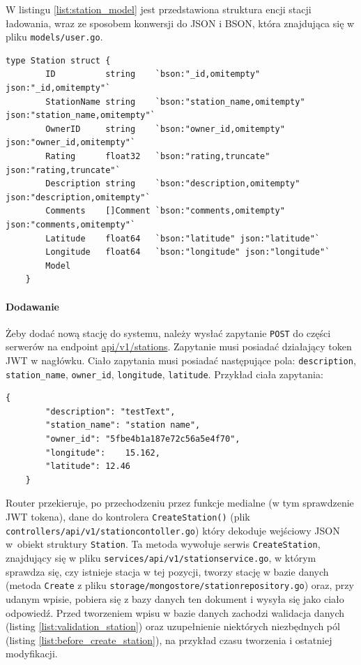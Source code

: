 W listingu \ref{list:station_model} jest przedstawiona struktura encji stacji ładowania, wraz ze sposobem konwersji do JSON i BSON, która znajdująca się w pliku \texttt{models/user.go}.
\begin{lstlisting}[label=list:station_model,caption=Model danych stacji ładowania,basicstyle=\tiny\ttfamily]
    type Station struct {
        ID          string    `bson:"_id,omitempty" json:"_id,omitempty"`
        StationName string    `bson:"station_name,omitempty" json:"station_name,omitempty"`
        OwnerID     string    `bson:"owner_id,omitempty" json:"owner_id,omitempty"`
        Rating      float32   `bson:"rating,truncate" json:"rating,truncate"`
        Description string    `bson:"description,omitempty" json:"description,omitempty"`
        Comments    []Comment `bson:"comments,omitempty" json:"comments,omitempty"`
        Latitude    float64   `bson:"latitude" json:"latitude"`
        Longitude   float64   `bson:"longitude" json:"longitude"`
        Model
    }
\end{lstlisting}

\paragraph{Dodawanie\newline}
Żeby dodać nową stację do systemu, należy wysłać zapytanie \texttt{POST} do części serwerów na endpoint \url{api/v1/stations}. Zapytanie musi posiadać działający token JWT w nagłówku. Ciało zapytania musi posiadać następujące pola: \texttt{description}, \texttt{station\_name}, \texttt{owner\_id}, \texttt{longitude}, \texttt{latitude}.
Przykład ciała zapytania:
\begin{lstlisting}[basicstyle=\tiny\ttfamily]
    {
		"description": "testText",
		"station_name": "station name",
		"owner_id": "5fbe4b1a187e72c56a5e4f70",
		"longitude":    15.162,
		"latitude": 12.46
    }
\end{lstlisting}

Router przekieruje, po przechodzeniu przez funkcje medialne (w tym sprawdzenie JWT tokena), dane do kontrolera \texttt{CreateStation()} (plik \texttt{controllers/api/v1/stationcontoller.go}) który dekoduje wejściowy JSON w~obiekt struktury \texttt{Station}.
Ta metoda wywołuje serwis \texttt{CreateStation}, znajdujący się w pliku \texttt{services/api/v1/stationservice.go}, w którym sprawdza się, czy istnieje stacja w tej pozycji, tworzy stację w bazie danych (metoda \texttt{Create} z pliku \texttt{storage/mongostore/stationrepository.go}) oraz, przy udanym wpisie, pobiera się z bazy danych ten dokument i wysyła się jako ciało odpowiedź.
Przed tworzeniem wpisu w bazie danych zachodzi walidacja danych (listing \ref{list:validation_station}) oraz uzupełnienie niektórych niezbędnych pól (listing \ref{list:before_create_station}), na przykład czasu tworzenia i ostatniej modyfikacji.

